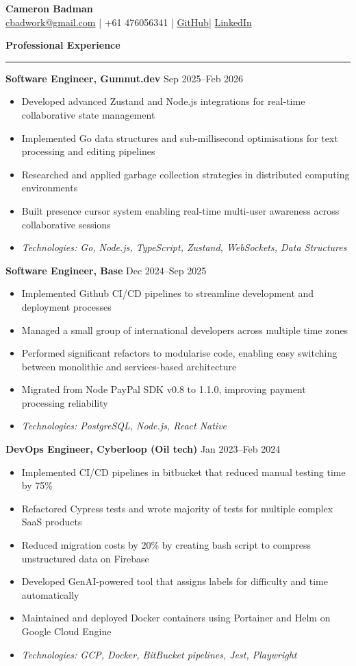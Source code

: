 \documentclass[9pt,a4paper]{extarticle}
\renewcommand{\section}[1]{%
	\vspace{2pt}%
	{\large\bfseries #1}\par\nobreak\vspace{-0.7em}%
	\rule{\linewidth}{0.4pt}\par\nobreak%
	\vspace{-2pt}%
}
\newenvironment{tightlist}{%
	\vspace{-3pt}%
	\begin{itemize}%
		\setlength{\leftmargin}{0pt}%
		\setlength{\itemindent}{0pt}%
		\setlength{\itemsep}{-2pt}%
		\setlength{\parsep}{0pt}%
		\setlength{\topsep}{0pt}%
		\setlength{\partopsep}{0pt}%
	}{%
	\end{itemize}%
	\vspace{-6pt}%
}
\begin{document}
	\begin{center}
		{\huge\textbf{Cameron Badman}} \\[0.3em]
		\href{mailto:cbadwork@gmail.com}{cbadwork@gmail.com} |
		+61 476056341 |
		\href{https://github.com/CameronBadman}{GitHub}|
		\href{https://www.linkedin.com/in/cameron-badman-5314ba1b8/}{LinkedIn}
	\end{center}
	\section{Professional Experience}
	\textbf{Software Engineer, Gumnut.dev} \hfill Sep 2025--Feb 2026
	\begin{tightlist}
		\item Developed advanced Zustand and Node.js integrations for real-time collaborative state management
		\item Implemented Go data structures and sub-millisecond optimisations for text processing and editing pipelines
		\item Researched and applied garbage collection strategies in distributed computing environments
		\item Built presence cursor system enabling real-time multi-user awareness across collaborative sessions
		\item \textit{Technologies: Go, Node.js, TypeScript, Zustand, WebSockets, Data Structures}
	\end{tightlist}
	\textbf{Software Engineer, Base} \hfill Dec 2024--Sep 2025
	\begin{tightlist}
		\item Implemented Github CI/CD pipelines to streamline development and deployment processes
		\item Managed a small group of international developers across multiple time zones
		\item Performed significant refactors to modularise code, enabling easy switching between monolithic and services-based architecture
		\item Migrated from Node PayPal SDK v0.8 to 1.1.0, improving payment processing reliability
		\item \textit{Technologies: PostgreSQL, Node.js, React Native}
	\end{tightlist}
	\textbf{DevOps Engineer, Cyberloop (Oil tech)} \hfill Jan 2023--Feb 2024
	\begin{tightlist}
		\item Implemented CI/CD pipelines in bitbucket that reduced manual testing time by 75\%
		\item Refactored Cypress tests and wrote majority of tests for multiple complex SaaS products
		\item Reduced migration costs by 20\% by creating bash script to compress unstructured data on Firebase
		\item Developed GenAI-powered tool that assigns labels for difficulty and time automatically
		\item Maintained and deployed Docker containers using Portainer and Helm on Google Cloud Engine
		\item \textit{Technologies: GCP, Docker, BitBucket pipelines, Jest, Playwright}
	\end{tightlist}
\end{document}

